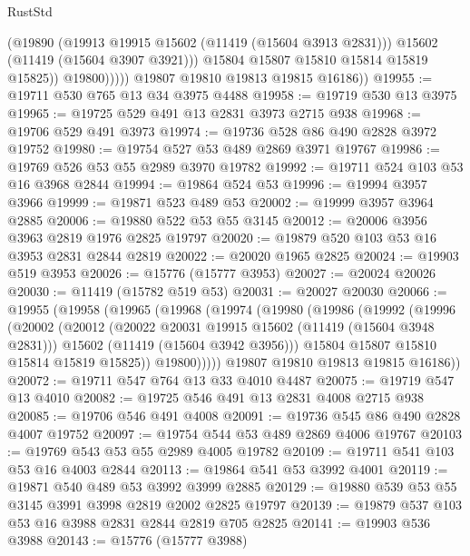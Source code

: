 \begin{lexlean}{RustStd}
\begin{coremodule}
                      (@19890
                        (@19913 @19915 @15602 (@11419 (@15604 @3913 @2831)))
                        @15602
                        (@11419 (@15604 @3907 @3921)))
                      @15804
                      @15807
                      @15810
                      @15814
                      @15819
                      @15825))
                  @19800)))))
        @19807
        @19810
        @19813
        @19815
        @16186))
@19955 := @19711 @530 @765 @13 @34 @3975 @4488
@19958 := @19719 @530 @13 @3975
@19965 := @19725 @529 @491 @13 @2831 @3973 @2715 @938
@19968 := @19706 @529 @491 @3973
@19974 := @19736 @528 @86 @490 @2828 @3972 @19752
@19980 := @19754 @527 @53 @489 @2869 @3971 @19767
@19986 := @19769 @526 @53 @55 @2989 @3970 @19782
@19992 := @19711 @524 @103 @53 @16 @3968 @2844
@19994 := @19864 @524 @53
@19996 := @19994 @3957 @3966
@19999 := @19871 @523 @489 @53
@20002 := @19999 @3957 @3964 @2885
@20006 := @19880 @522 @53 @55 @3145
@20012 := @20006 @3956 @3963 @2819 @1976 @2825 @19797
@20020 := @19879 @520 @103 @53 @16 @3953 @2831 @2844 @2819
@20022 := @20020 @1965 @2825
@20024 := @19903 @519 @3953
@20026 := @15776 (@15777 @3953)
@20027 := @20024 @20026
@20030 := @11419 (@15782 @519 @53)
@20031 := @20027 @20030
@20066 := @19955
    (@19958
      (@19965
        (@19968
          (@19974
            (@19980
              (@19986
                (@19992
                  (@19996
                    (@20002
                      (@20012
                        (@20022 @20031 @19915 @15602 (@11419 (@15604 @3948 @2831)))
                        @15602
                        (@11419 (@15604 @3942 @3956)))
                      @15804
                      @15807
                      @15810
                      @15814
                      @15819
                      @15825))
                  @19800)))))
        @19807
        @19810
        @19813
        @19815
        @16186))
@20072 := @19711 @547 @764 @13 @33 @4010 @4487
@20075 := @19719 @547 @13 @4010
@20082 := @19725 @546 @491 @13 @2831 @4008 @2715 @938
@20085 := @19706 @546 @491 @4008
@20091 := @19736 @545 @86 @490 @2828 @4007 @19752
@20097 := @19754 @544 @53 @489 @2869 @4006 @19767
@20103 := @19769 @543 @53 @55 @2989 @4005 @19782
@20109 := @19711 @541 @103 @53 @16 @4003 @2844
@20113 := @19864 @541 @53 @3992 @4001
@20119 := @19871 @540 @489 @53 @3992 @3999 @2885
@20129 := @19880 @539 @53 @55 @3145 @3991 @3998 @2819 @2002 @2825 @19797
@20139 := @19879 @537 @103 @53 @16 @3988 @2831 @2844 @2819 @705 @2825
@20141 := @19903 @536 @3988
@20143 := @15776 (@15777 @3988)

\end{coremodule}
\end{lexlean}
